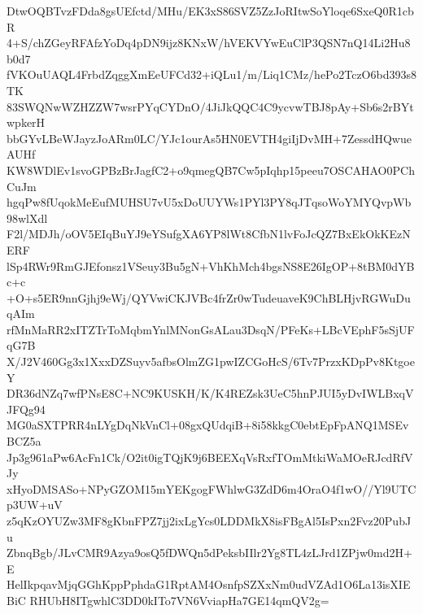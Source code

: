 DtwOQBTvzFDda8gsUEfctd/MHu/EK3xS86SVZ5ZzJoRItwSoYloqe6SxeQ0R1cbR
4+S/chZGeyRFAfzYoDq4pDN9ijz8KNxW/hVEKVYwEuClP3QSN7nQ14Li2Hu8b0d7
fVKOuUAQL4FrbdZqggXmEeUFCd32+iQLu1/m/Liq1CMz/hePo2TczO6bd393s8TK
83SWQNwWZHZZW7wsrPYqCYDnO/4JiJkQQC4C9ycvwTBJ8pAy+Sb6s2rBYtwpkerH
bbGYvLBeWJayzJoARm0LC/YJc1ourAs5HN0EVTH4giIjDvMH+7ZessdHQwueAUHf
KW8WDlEv1svoGPBzBrJagfC2+o9qmegQB7Cw5pIqhp15peeu7OSCAHAO0PChCuJm
hgqPw8fUqokMeEufMUHSU7vU5xDoUUYWs1PYl3PY8qJTqsoWoYMYQvpWb98wlXdl
F2l/MDJh/oOV5EIqBuYJ9eYSufgXA6YP8lWt8CfbN1lvFoJcQZ7BxEkOkKEzNERF
lSp4RWr9RmGJEfonsz1VSeuy3Bu5gN+VhKhMch4bgsNS8E26IgOP+8tBM0dYBc+c
+O+s5ER9nnGjhj9eWj/QYVwiCKJVBc4frZr0wTudeuaveK9ChBLHjvRGWuDuqAIm
rfMnMaRR2xITZTrToMqbmYnlMNonGsALau3DsqN/PFeKs+LBcVEphF5sSjUFqG7B
X/J2V460Gg3x1XxxDZSuyv5afbsOlmZG1pwIZCGoHcS/6Tv7PrzxKDpPv8KtgoeY
DR36dNZq7wfPNsE8C+NC9KUSKH/K/K4REZsk3UeC5hnPJUI5yDvIWLBxqVJFQg94
MG0aSXTPRR4nLYgDqNkVnCl+08gxQUdqiB+8i58kkgC0ebtEpFpANQ1MSEvBCZ5a
Jp3g961aPw6AcFn1Ck/O2it0igTQjK9j6BEEXqVsRxfTOmMtkiWaMOeRJcdRfVJy
xHyoDMSASo+NPyGZOM15mYEKgogFWhlwG3ZdD6m4OraO4f1wO//Yl9UTCp3UW+uV
z5qKzOYUZw3MF8gKbnFPZ7jj2ixLgYcs0LDDMkX8isFBgAl5IsPxn2Fvz20PubJu
ZbnqBgb/JLvCMR9Azya9osQ5fDWQn5dPeksbIIlr2Yg8TL4zLJrd1ZPjw0md2H+E
HelIkpqavMjqGGhKppPphdaG1RptAM4OsnfpSZXxNm0udVZAd1O6La13isXIEBiC
RHUbH8ITgwhlC3DD0kITo7VN6VviapHa7GE14qmQV2g=
